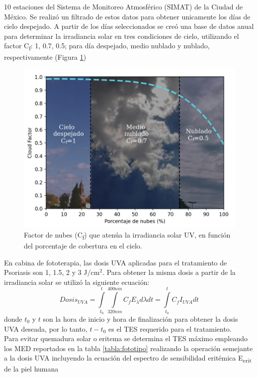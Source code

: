 \documentclass{article}
\begin{document}
\begin{multicols}{2}
 10 estaciones del Sistema de Monitoreo Atmosférico (SIMAT) de la Ciudad de México. Se realizó un filtrado de estos datos para
 obtener unicamente los días de cielo despejado. A partir de los días seleccionados se creó una base de datos anual para determinar
  la irradiancia solar en tres condiciones de cielo, utilizando el factor C\textsubscript{f}: 1, 0.7, 0.5; para día despejado, medio nublado y nublado, respectivamente
   (Figura \ref{fig:cloud})
 \begin{figure}[H]
    \centering
    \includegraphics[scale=0.68]{images/nubes.png}
    \caption{Factor de nubes (C\textsubscript{f}) que atenúa la irradiancia solar UV, en
    función del porcentaje de cobertura en el cielo. }
    \label{fig:cloud}
\end{figure}
En cabina de fototerapia, las dosis UVA aplicadas para el tratamiento de Psoriasis son 1, 1.5, 2 y 3 J/cm$^2$. 
Para obtener la misma dosis a partir de la irradiancia solar se utilizó la siguiente ecuación:
\begin{equation*}
    Dosis_{UVA}=\int\limits_{t_0}^t\int\limits_{320nm}^{400nm} C_f E_{\lambda} d\lambda dt =\int\limits_{t_0}^{t} C_f I_{UVA}dt
\end{equation*}
donde $t_0$ y $t$ son la hora de inicio y hora de finalización para obtener la dosis UVA deseada, 
por lo tanto, $t-t_0$ es el TES requerido para el tratamiento.\\ Para evitar quemadura solar o eritema se determina el TES máximo 
empleando los MED reportados en la tabla \ref{tabla:fototipo} realizando la operación semejante a la dosis UVA incluyendo la ecuación del espectro de sensibilidad eritémica E\textsubscript{erit} de la piel humana

\end{multicols}
\end{document}
